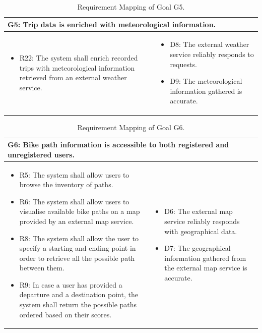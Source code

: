 \begin{table}[H]
    \renewcommand{\arraystretch}{1.3}
    \begin{tabularx}{\textwidth}{|X|X|}
    \hline
    \multicolumn{2}{|p{0.95\textwidth}|}{G5: Trip data is enriched with meteorological information.}  \\ \hline
    \begin{itemize}[topsep=0pt, partopsep=0pt, leftmargin=*]
        \item R22: The system shall enrich recorded trips with meteorological information retrieved from an external weather service.
    \end{itemize} & \begin{itemize}[topsep=0pt, partopsep=0pt, leftmargin=*]
        \item D8: The external weather service reliably responds to requests.
        \item D9: The meteorological information gathered is accurate.
    \end{itemize} \\ \hline
    \end{tabularx}
    \caption{Requirement Mapping of Goal G5.}
    \label{tab:rm_g5}
\end{table}

\begin{table}[H]
    \renewcommand{\arraystretch}{1.3}
    \begin{tabularx}{\textwidth}{|X|X|}
    \hline
    \multicolumn{2}{|p{0.95\textwidth}|}{G6: Bike path information is accessible to both registered and unregistered users.} \\ \hline
    \begin{itemize}[topsep=0pt, partopsep=0pt, leftmargin=*]
        \item R5: The system shall allow users to browse the inventory of paths.
        \item R6: The system shall allow users to visualise available bike paths on a map provided by an external map service.
        \item R8: The system shall allow the user to specify a starting and ending point in order to retrieve all the possible path between them.
        \item R9: In case a user has provided a departure and a destination point, the system shall return the possible paths ordered based on their scores.
    \end{itemize} & \begin{itemize}[topsep=0pt, partopsep=0pt, leftmargin=*]
        \item D6: The external map service reliably responds with geographical data.
        \item D7: The geographical information gathered from the external map service is accurate.
    \end{itemize} \\ \hline
    \end{tabularx}
    \caption{Requirement Mapping of Goal G6.}
    \label{tab:rm_g6}
\end{table}

